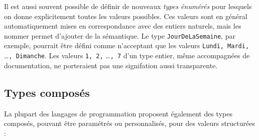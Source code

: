 \documentclass[a4paper,francais]{insalyon}
\begin{document}
Il est aussi souvent possible de définir de nouveaux \emph{types énumérés} pour lesquels on donne explicitement toutes les valeurs possibles. Ces valeurs sont en général automatiquement mises en correspondance avec des entiers naturels, mais les nommer permet d'ajouter de la sémantique. Le type \texttt{JourDeLaSemaine}, par exemple, pourrait être défini comme n'acceptant que les valeurs \verb!Lundi, Mardi,! \ldots \verb!, Dimanche!. Les valeurs \verb!1, 2,! \ldots \verb!, 7! d'un type entier, même accompagnées de documentation, ne porteraient pas une signifation aussi transparente.    

\subsection{Types composés}

La plupart des langages de programmation proposent également des types composés, pouvant être paramétrés ou personnalisés, pour des valeurs structurées :
\end{document}
